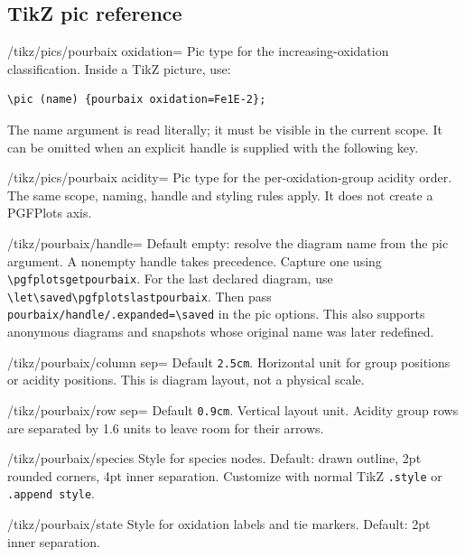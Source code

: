 \documentclass[a4paper,11pt]{ltxdoc}
\begin{document}
\subsection{TikZ pic reference}
\begin{key}{/tikz/pics/pourbaix oxidation=}
Pic type for the increasing-oxidation classification. Inside a TikZ picture, use:
\begin{verbatim}
\pic (name) {pourbaix oxidation=Fe1E-2};
\end{verbatim}
The name
argument is read literally; it must be visible in the current scope. It can be
omitted when an explicit handle is supplied with the following key.
\end{key}
\begin{key}{/tikz/pics/pourbaix acidity=}
Pic type for the per-oxidation-group acidity order. The same scope, naming,
handle and styling rules apply. It does not create a PGFPlots axis.
\end{key}
\begin{key}{/tikz/pourbaix/handle=}
Default empty: resolve the diagram name from the pic argument. A nonempty handle
takes precedence. Capture one using \verb|\pgfplotsgetpourbaix|.
For the last declared diagram, use \verb|\let\saved\pgfplotslastpourbaix|.
Then pass \verb|pourbaix/handle/.expanded=\saved| in the pic options. This also supports
anonymous diagrams and snapshots whose original name was later redefined.
\end{key}
\begin{key}{/tikz/pourbaix/column sep=}
Default \texttt{2.5cm}. Horizontal unit for group positions or acidity positions.
This is diagram layout, not a physical scale.
\end{key}
\begin{key}{/tikz/pourbaix/row sep=}
Default \texttt{0.9cm}. Vertical layout unit. Acidity group rows are separated
by 1.6 units to leave room for their arrows.
\end{key}
\begin{key}{/tikz/pourbaix/species}
Style for species nodes. Default: drawn outline, 2pt rounded corners, 4pt inner
separation. Customize with normal TikZ \texttt{.style} or \texttt{.append style}.
\end{key}
\begin{key}{/tikz/pourbaix/state}
Style for oxidation labels and tie markers. Default: 2pt inner separation.
\end{key}
\end{document}
